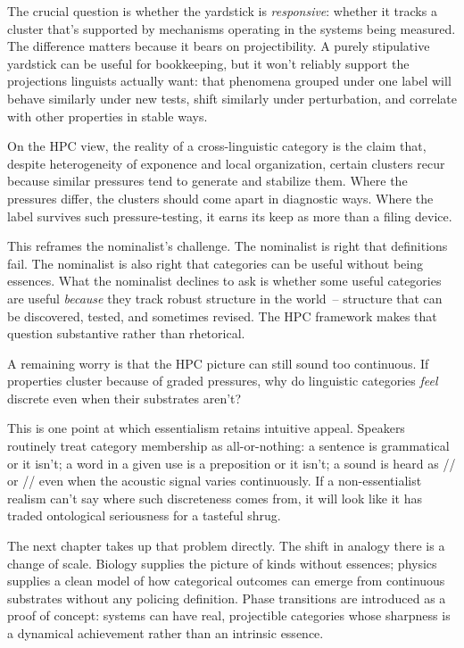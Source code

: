 The crucial question is whether the yardstick is \emph{responsive}: whether it tracks a cluster that's supported by mechanisms operating in the systems being measured. The difference matters because it bears on projectibility. A purely stipulative yardstick can be useful for bookkeeping, but it won't reliably support the projections linguists actually want: that phenomena grouped under one label will behave similarly under new tests, shift similarly under perturbation, and correlate with other properties in stable ways.

On the HPC view, the reality of a cross-linguistic category is the claim that, despite heterogeneity of exponence and local organization, certain clusters recur because similar pressures tend to generate and stabilize them. Where the pressures differ, the clusters should come apart in diagnostic ways. Where the label survives such pressure-testing, it earns its keep as more than a filing device.

This reframes the nominalist's challenge. The nominalist is right that definitions fail. The nominalist is also right that categories can be useful without being essences. What the nominalist declines to ask is whether some useful categories are useful \emph{because} they track robust structure in the world~-- structure that can be discovered, tested, and sometimes revised. The HPC framework makes that question substantive rather than rhetorical.

A remaining worry is that the HPC picture can still sound too continuous. If properties cluster because of graded pressures, why do linguistic categories \emph{feel} discrete even when their substrates aren't?

This is one point at which essentialism retains intuitive appeal. Speakers routinely treat category membership as all-or-nothing: a sentence is grammatical or it isn't; a word in a given use is a preposition or it isn't; a sound is heard as // or // even when the acoustic signal varies continuously. If a non-essentialist realism can't say where such discreteness comes from, it will look like it has traded ontological seriousness for a tasteful shrug.

The next chapter takes up that problem directly. The shift in analogy there is a change of scale. Biology supplies the picture of kinds without essences; physics supplies a clean model of how categorical outcomes can emerge from continuous substrates without any policing definition. Phase transitions are introduced as a proof of concept: systems can have real, projectible categories whose sharpness is a dynamical achievement rather than an intrinsic essence.

